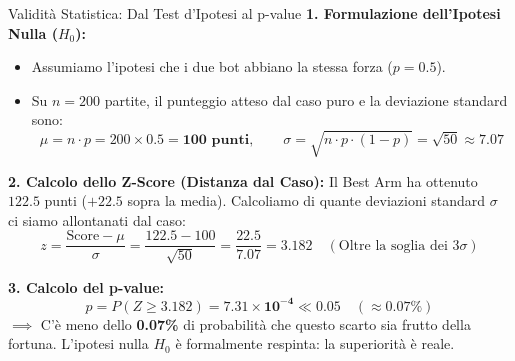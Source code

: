 \documentclass[10pt]{beamer}
\begin{document}
\begin{frame}{Validità Statistica: Dal Test d'Ipotesi al p-value}
    \textbf{1. Formulazione dell'Ipotesi Nulla ($H_0$):}
    \begin{itemize}
        \item Assumiamo l'ipotesi che i due bot abbiano la stessa forza ($p = 0.5$).
        \item Su $n = 200$ partite, il punteggio atteso dal caso puro e la deviazione standard sono:
        $$\mu = n \cdot p = 200 \times 0.5 = \mathbf{100 \text{ punti}}, \qquad \sigma = \sqrt{n \cdot p \cdot (1-p)} = \sqrt{50} \approx \mathbf{7.07}$$
    \end{itemize}
    
    \vspace{0.15cm}
    \textbf{2. Calcolo dello Z-Score (Distanza dal Caso):}
    Il Best Arm ha ottenuto $122.5$ punti ($+22.5$ sopra la media). Calcoliamo di quante deviazioni standard $\sigma$ ci siamo allontanati dal caso:
    $$z = \frac{\text{Score} - \mu}{\sigma} = \frac{122.5 - 100}{\sqrt{50}} = \frac{22.5}{7.07} = \mathbf{3.182} \quad (\text{Oltre la soglia dei } 3\sigma)$$
    
    \vspace{0.15cm}
    \textbf{3. Calcolo del p-value:}
    $$p = P(Z \ge 3.182) = \mathbf{7.31 \times 10^{-4}} \ll 0.05 \quad (\approx \mathbf{0.07\%})$$
    \footnotesize
    $\implies$ C'è meno dello \textbf{0.07\%} di probabilità che questo scarto sia frutto della fortuna. L'ipotesi nulla $H_0$ è formalmente respinta: la superiorità è reale.
\end{frame}
\end{document}
